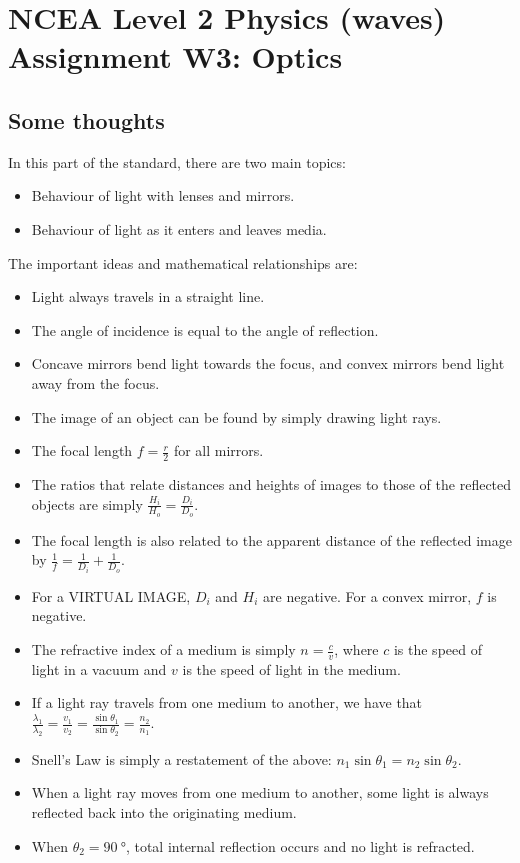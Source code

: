 \documentclass[answers]{exam}
\begin{document}
\section*{NCEA Level 2 Physics (waves)\\Assignment W3: Optics}

\begin{questions}
\end{questions}

\clearpage
\subsection*{Some thoughts}
In this part of the standard, there are two main topics:
\begin{itemize}
  \item Behaviour of light with lenses and mirrors.
  \item Behaviour of light as it enters and leaves media.
\end{itemize}

The important ideas and mathematical relationships are:
\begin{itemize}
  \item Light always travels in a straight line.
  \item The angle of incidence is equal to the angle of reflection.
  \item Concave mirrors bend light towards the focus, and convex mirrors bend light away from the focus.
  \item The image of an object can be found by simply drawing light rays.
  \item The focal length $ f = \frac{r}{2} $ for all mirrors.
  \item The ratios that relate distances and heights of images to those of the reflected objects are simply $ \frac{H_i}{H_o} = \frac{D_i}{D_o} $.
  \item The focal length is also related to the apparent distance of the reflected image by $ \frac{1}{f} = \frac{1}{D_i} + \frac{1}{D_o} $.
  \item For a VIRTUAL IMAGE, $ D_i $ and $ H_i $ are negative. For a convex mirror, $ f $ is negative.
  \item The refractive index of a medium is simply $ n = \frac{c}{v} $, where $ c $ is the speed of light in a vacuum and $ v $ is the speed
        of light in the medium.
  \item If a light ray travels from one medium to another, we have
        that $ \frac{\lambda_1}{\lambda_2} = \frac{v_1}{v_2} = \frac{\sin \theta_1}{\sin \theta_2} = \frac{n_2}{n_1} $.
  \item Snell's Law is simply a restatement of the above: $ n_1 \sin \theta_1 = n_2 \sin\theta_2 $.
  \item When a light ray moves from one medium to another, some light is always reflected back into the originating
        medium.
  \item When $ \theta_2 = \SI{90}{\degree} $, total internal reflection occurs and no light is refracted.
\end{itemize}
\end{document}
